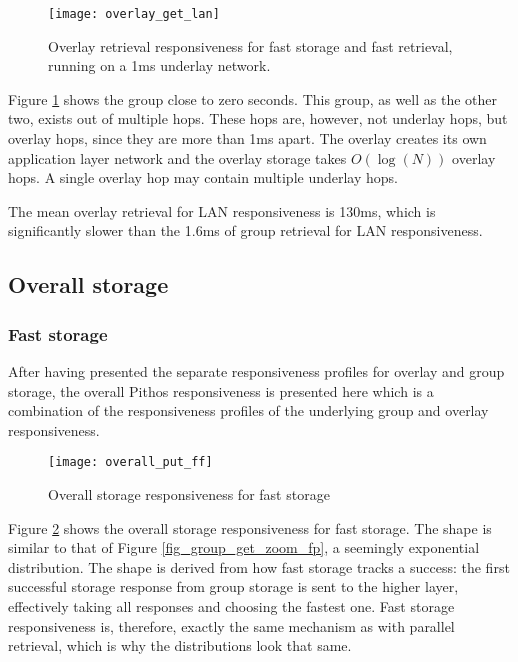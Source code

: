 \begin{figure}[htbp]
 \centering
 \texttt{[image: overlay\_get\_lan]}
 \caption{Overlay retrieval responsiveness for fast storage and fast retrieval, running on a 1ms underlay network.}
 \label{fig_overlay_get_lan}
\end{figure}
%
Figure \ref{fig_overlay_get_lan} shows the group close to zero seconds. This group, as well as the other two, exists out of multiple hops. These hops are, however, not underlay hops, but overlay hops, since they are more than 1ms apart. The overlay creates its own application layer network and the overlay storage takes $O(\log(N))$ overlay hops. A single overlay hop may contain multiple underlay hops.

The mean overlay retrieval for LAN responsiveness is 130ms, which is significantly slower than the 1.6ms of group retrieval for LAN responsiveness.

\subsection{Overall storage}

\subsubsection{Fast storage}
After having presented the separate responsiveness profiles for overlay and group storage, the overall Pithos responsiveness is presented here which is a combination of the responsiveness profiles of the underlying group and overlay responsiveness.

\begin{figure}[htbp]
 \centering
 \texttt{[image: overall\_put\_ff]}
 \caption{Overall storage responsiveness for fast storage}
 \label{fig_overall_put_ff}
\end{figure}
%
Figure \ref{fig_overall_put_ff} shows the overall storage responsiveness for fast storage. The shape is similar to that of Figure \ref{fig_group_get_zoom_fp}, a seemingly exponential distribution. The shape is derived from how fast storage tracks a success: the first successful storage response from group storage is sent to the higher layer, effectively taking all responses and choosing the fastest one. Fast storage responsiveness is, therefore, exactly the same mechanism as with parallel retrieval, which is why the distributions look that same.

